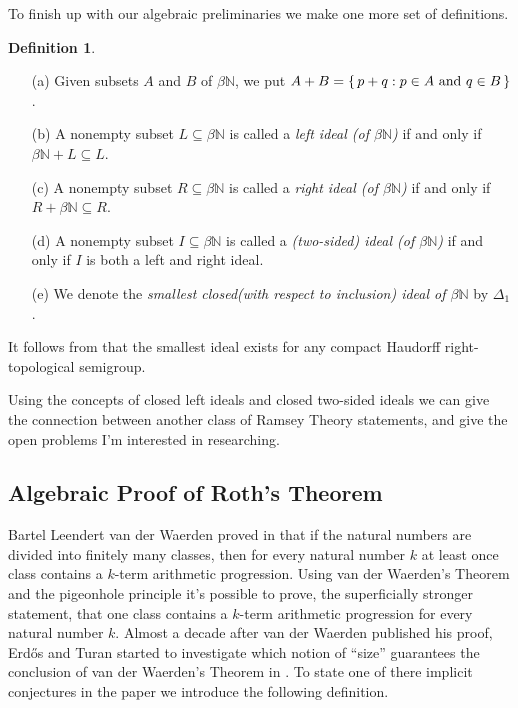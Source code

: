 \documentclass[12pt]{article}
\theoremstyle{plain}
\theoremstyle{definition}
\newtheorem{defn}[thm]{Definition}
\newcommand{\bbN}{\mathbb{N}}
\begin{document}
To finish up with our algebraic preliminaries we make one more
set of definitions.
  \begin{defn}
    \begin{itemize}
      \item[(a)] Given subsets $A$ and $B$ of $\beta\bbN$, we put $A +
        B = \{\, p+q : \hbox{$p \in A$ and $q \in B$} \,\}$.
      \item[(b)] A nonempty subset $L \subseteq \beta\bbN$ is called a
        \textsl{left ideal (of $\beta\bbN$)} if and only if $\beta\bbN
        + L \subseteq L$.
      \item[(c)] A nonempty subset $R \subseteq \beta\bbN$ is called a
        \textsl{right ideal (of $\beta\bbN$)} if and only if $R +
        \beta\bbN \subseteq R$.
      \item[(d)] A nonempty subset $I \subseteq \beta\bbN$ is called a
        \textsl{(two-sided) ideal (of $\beta\bbN$)} if and only if $I$
        is both a left and right ideal.
      \item[(e)] We denote the \textsl{smallest closed(with respect to
          inclusion) ideal of $\beta\bbN$} by $\Delta_1$.
    \end{itemize}
  \end{defn}
It follows from \cite[Theorem 2.8]{Hindman:1998fk} that the smallest ideal
exists for any compact Haudorff right-topological semigroup. 

Using the concepts of closed left ideals and closed two-sided ideals
we can give the connection between another class of Ramsey Theory
statements, and give the open problems I'm interested in researching.

\subsection{Algebraic Proof of Roth's Theorem}
Bartel Leendert van der Waerden proved in
\cite{Van-der-Waerden:1927fk} that if the natural numbers are divided
into finitely many classes, then for every natural number $k$ at least
once class contains a $k$-term arithmetic progression. 
Using van der Waerden's Theorem and the pigeonhole principle it's
possible to prove, the superficially stronger statement, that one
class contains a $k$-term arithmetic progression for every natural
number $k$. 
Almost a decade after van der Waerden published his proof, Erd\H{o}s
and Turan started to investigate which notion of ``size'' guarantees
the conclusion of van der Waerden's Theorem in \cite{Erdos:1936fk}.
To state one of there implicit conjectures in the paper we introduce
the following definition.
\end{document}
